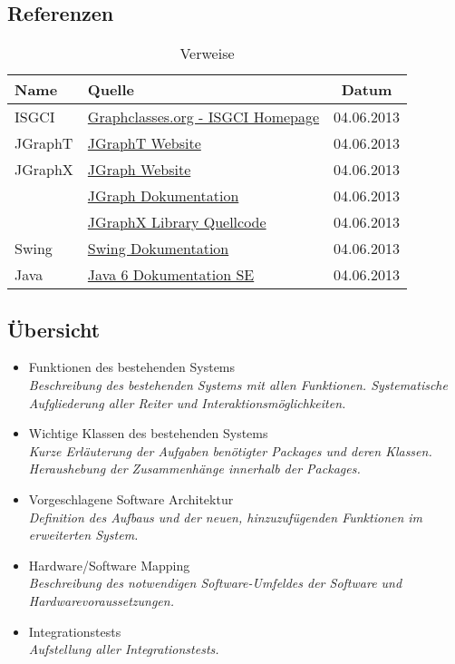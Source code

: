 \documentclass[10pt,a4paper]{article}
\begin{document}
\subsection{Referenzen}
\begin{table}[h]
          	\caption{Verweise}
          	\label{fig:figurename}
          	\begin{center}
          		\begin{tabular}{|l|p{10cm}|c|}
          		\hline
          
          		\hline
          		\textbf{Name} & \textbf{Quelle} & \textbf{Datum} \\
          		\hline
          			 ISGCI & \href{http://www.graphclasses.org/help.html}{Graphclasses.org - ISGCI Homepage} & 04.06.2013\\ \hline
          			 JGraphT & \href{http://jgrapht.org/}{JGraphT Website} & 04.06.2013 \\ \hline
          			 JGraphX & \href{http://www.jgraph.com/}{JGraph Website} & 04.06.2013 \\  \hline
          			  & \href{http://jgraph.github.io/mxgraph/java/docs/index.html}{JGraph Dokumentation} & 04.06.2013 \\  \hline
          			  & \href{https://github.com/jgraph/jgraphx}{JGraphX Library Quellcode} & 04.06.2013\\  \hline
					Swing & \href{http://docs.oracle.com/javase/1.4.2/docs/api/javax/swing/package-summary.html}{Swing Dokumentation} & 04.06.2013 \\  \hline
					Java & \href{http://docs.oracle.com/javase/6/docs/api/}{Java 6 Dokumentation SE} & 04.06.2013 \\  \hline
          		\end{tabular}
          	\end{center}
          \end{table}
\subsection{Übersicht}
\begin{itemize}
\item Funktionen des bestehenden Systems\\
\textit{Beschreibung des bestehenden Systems mit allen Funktionen. Systematische Aufgliederung aller Reiter und Interaktionsmöglichkeiten.}
\item Wichtige Klassen des bestehenden Systems\\
\textit{Kurze Erläuterung der Aufgaben benötigter Packages und deren Klassen. Heraushebung der Zusammenhänge innerhalb der Packages.}
\item Vorgeschlagene Software Architektur\\
\textit{Definition des Aufbaus und der neuen, hinzuzufügenden Funktionen im erweiterten System.}
\item Hardware/Software Mapping\\
\textit{Beschreibung des notwendigen Software-Umfeldes der Software und Hardwarevoraussetzungen.}
\item Integrationstests\\
\textit{Aufstellung aller Integrationstests.}
\end{itemize}  
\newpage
\end{document}
